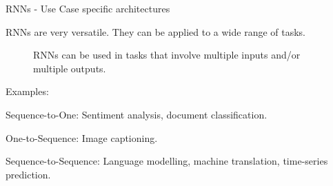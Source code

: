 \begin{frame} {RNNs - Use Case specific architectures}

  \small{RNNs are very versatile. They can be applied to a wide range of tasks.
  
  \begin{figure}
      \centering
      \caption{\footnotesize {RNNs can be used in tasks that involve multiple inputs and/or multiple outputs. }}
  \end{figure}
  Examples:}
  \begin{itemize}
    \item \small{Sequence-to-One: Sentiment analysis, document classification.
    \item One-to-Sequence: Image captioning.
    \item Sequence-to-Sequence: Language modelling, machine translation, time-series prediction.}
  \end{itemize}
\end{frame}




